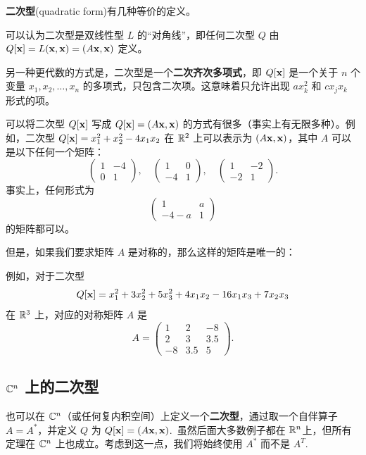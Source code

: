 \textbf{二次型}(quadratic form)有几种等价的定义。

可以认为二次型是双线性型 $L$ 的“对角线”，即任何二次型 $Q$ 由 $Q[\mathbf{x}] = L(\mathbf{x}, \mathbf{x}) = (A\mathbf{x}, \mathbf{x})$ 定义。

另一种更代数的方式是，二次型是一个\textbf{二次齐次多项式}，即 $Q[\mathbf{x}]$ 是一个关于 $n$ 个变量 $x_1, x_2, \dots, x_n$ 的多项式，只包含二次项。这意味着只允许出现 $ax_k^2$ 和 $cx_j x_k$ 形式的项。

可以将二次型 $Q[\mathbf{x}]$ 写成 $Q[\mathbf{x}] = (A\mathbf{x}, \mathbf{x})$ 的方式有很多（事实上有无限多种）。例如，二次型 $Q[\mathbf{x}] = x_1^2 + x_2^2 - 4x_1x_2$ 在 $\mathbb{R}^2$ 上可以表示为 $(A\mathbf{x}, \mathbf{x})$，其中 $A$ 可以是以下任何一个矩阵：
$$\begin{pmatrix} 1 & -4 \\ 0 & 1 \end{pmatrix}, \quad \begin{pmatrix} 1 & 0 \\ -4 & 1 \end{pmatrix}, \quad \begin{pmatrix} 1 & -2 \\ -2 & 1 \end{pmatrix}.$$
事实上，任何形式为 $$\begin{pmatrix} 1 & a \\ -4-a & 1 \end{pmatrix}$$
的矩阵都可以。

但是，如果我们要求矩阵 $A$ 是对称的，那么这样的矩阵是唯一的：


例如，对于二次型
$$Q[\mathbf{x}] = x_1^2 + 3x_2^2 + 5x_3^2 + 4x_1x_2 - 16x_1x_3 + 7x_2x_3$$
在 $\mathbb{R}^3$ 上，对应的对称矩阵 $A$ 是
$$A = \begin{pmatrix} 1 & 2 & -8 \\ 2 & 3 & 3.5 \\ -8 & 3.5 & 5 \end{pmatrix}.$$

\subsection{\texorpdfstring{$\mathbb{C}^n$ 上的二次型}{C^n 上的二次型}}\label{sec:07-01-03}

也可以在 $\mathbb{C}^n$（或任何复内积空间）上定义一个\textbf{二次型}，通过取一个自伴算子 $A = A^*$，并定义 $Q$ 为 $Q[\mathbf{x}] = (A\mathbf{x}, \mathbf{x})$.~虽然后面大多数例子都在 $\mathbb{R}^n$上，但所有定理在 $\mathbb{C}^n$ 上也成立。考虑到这一点，我们将始终使用 $A^*$ 而不是 $A^T$.~

